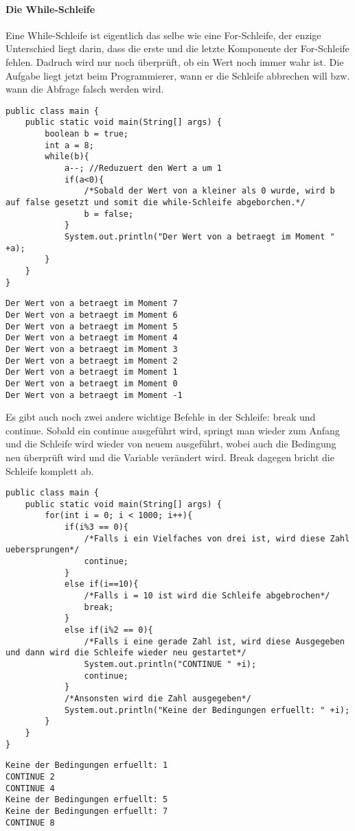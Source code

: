 \paragraph{Die While-Schleife}
Eine While-Schleife ist eigentlich das selbe wie eine For-Schleife, der enzige Unterschied liegt darin, dass die erste und die letzte Komponente der For-Schleife fehlen. Dadruch wird nur noch überprüft, ob ein Wert noch immer wahr ist. Die Aufgabe liegt jetzt beim Programmierer, wann er die Schleife abbrechen will bzw. wann die Abfrage falsch werden wird.
\begin{lstlisting}
public class main {
	public static void main(String[] args) {
		boolean b = true;
		int a = 8;
		while(b){
			a--; //Reduzuert den Wert a um 1
			if(a<0){
				/*Sobald der Wert von a kleiner als 0 wurde, wird b auf false gesetzt und somit die while-Schleife abgeborchen.*/
				b = false;
			}
			System.out.println("Der Wert von a betraegt im Moment " +a);
		}
	}
}
\end{lstlisting}
\begin{lstlisting}[style=console]
Der Wert von a betraegt im Moment 7
Der Wert von a betraegt im Moment 6
Der Wert von a betraegt im Moment 5
Der Wert von a betraegt im Moment 4
Der Wert von a betraegt im Moment 3
Der Wert von a betraegt im Moment 2
Der Wert von a betraegt im Moment 1
Der Wert von a betraegt im Moment 0
Der Wert von a betraegt im Moment -1
\end{lstlisting}
Es gibt auch noch zwei andere wichtige Befehle in der Schleife: break und continue. Sobald ein continue ausgeführt wird, springt man wieder zum Anfang und die Schleife wird wieder von neuem ausgeführt, wobei auch die Bedingung neu überprüft wird und die Variable verändert wird. Break dagegen bricht die Schleife komplett ab.
\begin{lstlisting}
public class main {
	public static void main(String[] args) {
		for(int i = 0; i < 1000; i++){
			if(i%3 == 0){
				/*Falls i ein Vielfaches von drei ist, wird diese Zahl uebersprungen*/
				continue;
			}
			else if(i==10){
				/*Falls i = 10 ist wird die Schleife abgebrochen*/
				break;
			}
			else if(i%2 == 0){
				/*Falls i eine gerade Zahl ist, wird diese Ausgegeben und dann wird die Schleife wieder neu gestartet*/
				System.out.println("CONTINUE " +i);
				continue;
			}
			/*Ansonsten wird die Zahl ausgegeben*/
			System.out.println("Keine der Bedingungen erfuellt: " +i);
		}
	}
}
\end{lstlisting}
\begin{lstlisting}[style=console]
Keine der Bedingungen erfuellt: 1
CONTINUE 2
CONTINUE 4
Keine der Bedingungen erfuellt: 5
Keine der Bedingungen erfuellt: 7
CONTINUE 8
\end{lstlisting}
